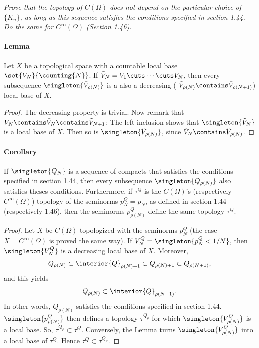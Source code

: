 \textit{
Prove that the topology of $C(\Omega)$ does not depend on the particular 
choice of $\{K_{n}\}$, as long as this sequence satisfies the conditions 
specified in section 1.44. Do the same for $C^\infty(\Omega)$ (Section 1.46).}
%
\paragraph{Lemma} Let $X$ be a topological space with a countable local base 
$\set{V_N}{\counting{N}}$. 
If 
%
  $\tilde{V}_N = V_1 \cuts \cdots \cuts V_N$, 
%
then every subsequence 
% 
  $\singleton{\tilde{V}_{\rho(N)}}$ 
%
is a also a {decreasing} (\ie 
%
  $\tilde{V}_{\rho(N)} \contains \tilde{V}_{\rho(N+1)}$)
%
local base of $X$.
%
\begin{proof}
The decreasing property is trivial. Now remark that 
%
  $V_N \contains \tilde{V}_N \contains \tilde{V}_{N+1}$:
%
The left inclusion shows that 
%
  $\singleton{\tilde{V}_N}$ 
% 
is a local base of $X$. Then so is 
%
  $\singleton{\tilde{V}_{\rho(N)}}$,
% 
since $\tilde{V}_N \contains \tilde{V}_{\rho(N)}$.
\end{proof}
%
\paragraph{Corollary}
If 
%
  $\singleton{Q_N}$ 
%
is a sequence of compacts that satisfies the conditions specified 
in section 1.44, then every subsequence 
%
  $\singleton{Q_{\rho(N)}}$ 
%
also satisfies theses conditions.
%
Furthermore, if $\tau^{Q}$ is the $C(\Omega)$'s 
(respectively $C^\infty (\Omega)$) topology of the seminorms $p^{Q}_N = p_N$, 
as defined in section 1.44 (respectively 1.46), then the seminorms 
%
  $p^{Q}_{\rho(N)}$ 
%
define the same topology $\tau^{Q}$.
%
\begin{proof}%
%
Let $X$ be $C(\Omega)$ topologized with the seminorms $p^{Q}_N$ 
(the case $X=C^\infty(\Omega)$ is proved the same way).
%
If 
    $V^{Q}_N = \singleton{p^{Q}_N < 1/N}$, 
then 
    $\singleton{V^{Q}_N}$ 
is a decreasing local base of $X$.
%
Moreover,
% 
  \begin{align}
    Q_{\rho(N)} 
      \subset 
    \interior{Q}_{\rho(N) + 1} 
      \subset 
    Q_{\rho(N) + 1} 
      \subset 
    Q_{\rho(N+ 1)},
  \end{align}
% 
and this yields
%
  \begin{align}
    Q_{\rho(N)} 
      \subset 
    \interior{Q}_{\rho(N+ 1)}.
  \end{align}
%
In other words, 
%
  $Q_{\rho(N)}$ satisfies the conditions specified in section 1.44.
%
%
  $\singleton{p^{Q}_{\rho(N)}}$
% 
then defines a topology $\tau^{Q_\rho}$ for which  
% 
  $\singleton{V^{Q}_{\rho(N)}}$ 
%
is a local base. So, 
% 
  $\tau^{Q_\rho} \subset \tau^{Q}$.
%
Conversely, the Lemma turns 
%
  $\singleton{V^{Q}_{\rho(N)}}$ 
%
into a local base of $\tau^{Q}$. Hence  
%
  $\tau^{Q}\subset \tau^{Q_\rho}$.
%
\end{proof}
